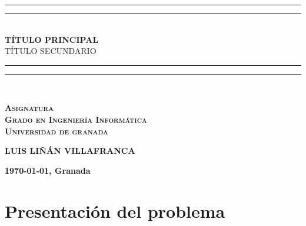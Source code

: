 \documentclass[paper=a4, fontsize=11pt]{scrartcl} %
\begin{document}
\begin{titlepage}
  \centering %
  \vspace*{\baselineskip} %
  \rule{\textwidth}{0.5px}\vspace*{-\baselineskip}\vspace*{2pt} %
  \rule{\textwidth}{0.5px}\\[\baselineskip] %
  
  {\huge \textbf{TÍTULO PRINCIPAL}}\\[0.8\baselineskip]{\LARGE TÍTULO SECUNDARIO} \\[0.2\baselineskip] %
  
  \rule{\textwidth}{0.5px}\vspace*{-\baselineskip}\vspace*{2pt} %
  \rule{\textwidth}{0.5px}\\[\baselineskip] %
  
  \vfill %
  
  \scshape %
  \textbf{{\LARGE Asignatura} \\[\baselineskip]
    Grado en Ingeniería Informática \\
    Universidad de granada} %
  
  \vfill
  
  \textbf{\LARGE LUIS LIÑÁN VILLAFRANCA} %
  
  \vfill 
  
  \textbf{\normalsize \today, Granada}
  
\end{titlepage}


\tableofcontents

\listoffigures

\listoftables

\pagebreak


\section{Presentación del problema}



\end{document}

